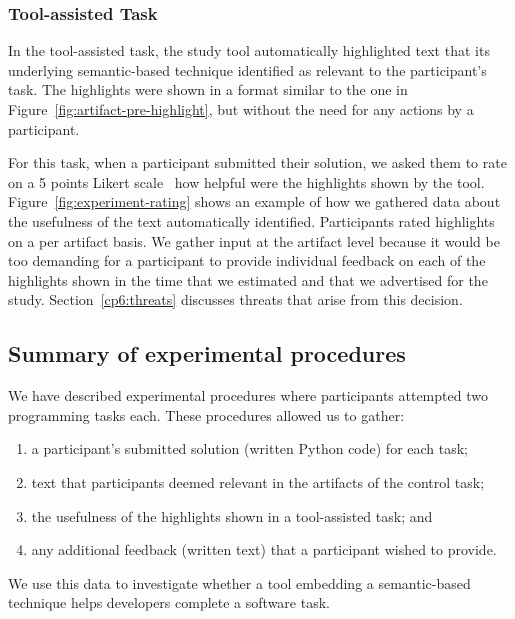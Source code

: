 \subsubsection{Tool-assisted Task}
\label{cp6:procedures-tool-assisted}


In the tool-assisted task, the study tool automatically highlighted text that 
its underlying semantic-based technique identified as relevant to the participant's task.
The highlights were shown in a format similar to the one in Figure~\ref{fig:artifact-pre-highlight}, but without the need for any actions by a participant.




For this task, when a participant submitted their solution, we asked them to 
rate on a 5 points Likert scale~\cite{likert1932technique} how helpful were the highlights shown by the tool.
Figure~\ref{fig:experiment-rating} shows an example of how we gathered data about the usefulness of the text automatically identified.
Participants rated highlights on a per artifact basis.
We gather input at the artifact level because it would be too demanding for a participant 
to provide individual feedback on each of the highlights shown
in the time that we estimated and that we advertised for the study.
Section~\ref{cp6:threats} discusses  threats that arise from this decision.







\subsection{Summary of experimental procedures}


We have described experimental procedures 
where participants attempted two programming tasks each.
These procedures allowed us to gather:


\begin{enumerate}
\item a participant's submitted solution (written Python code) for each task;
\item text that participants deemed relevant in the artifacts of the control task;
\item the usefulness of the highlights shown in a tool-assisted task; and
\item any additional feedback (written text) that a participant wished to provide.
\end{enumerate}


We use this data to investigate whether 
a tool embedding a semantic-based technique helps developers complete a software task. 


\clearpage


